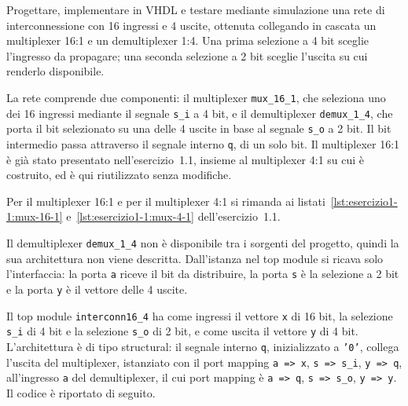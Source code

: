 \label{sec:esercizio1-2}

\begin{traccia}
Progettare, implementare in VHDL e testare mediante simulazione una rete di interconnessione con 16 ingressi e 4 uscite, ottenuta collegando in cascata un multiplexer 16:1 e un demultiplexer 1:4. Una prima selezione a 4 bit sceglie l'ingresso da propagare; una seconda selezione a 2 bit sceglie l'uscita su cui renderlo disponibile.
\end{traccia}

\progetto

La rete comprende due componenti: il multiplexer \texttt{mux\_16\_1}, che seleziona uno dei 16 ingressi mediante il segnale \texttt{s\_i} a 4 bit, e il demultiplexer \texttt{demux\_1\_4}, che porta il bit selezionato su una delle 4 uscite in base al segnale \texttt{s\_o} a 2 bit. Il bit intermedio passa attraverso il segnale interno \texttt{q}, di un solo bit. Il multiplexer 16:1 è già stato presentato nell'esercizio~1.1, insieme al multiplexer 4:1 su cui è costruito, ed è qui riutilizzato senza modifiche.


\implementazione

Per il multiplexer 16:1 e per il multiplexer 4:1 si rimanda ai listati~\ref{lst:esercizio1-1:mux-16-1} e~\ref{lst:esercizio1-1:mux-4-1} dell'esercizio~1.1.

Il demultiplexer \texttt{demux\_1\_4} non è disponibile tra i sorgenti del progetto, quindi la sua architettura non viene descritta. Dall'istanza nel top module si ricava solo l'interfaccia: la porta \texttt{a} riceve il bit da distribuire, la porta \texttt{s} è la selezione a 2 bit e la porta \texttt{y} è il vettore delle 4 uscite.


Il top module \texttt{interconn16\_4} ha come ingressi il vettore \texttt{x} di 16 bit, la selezione \texttt{s\_i} di 4 bit e la selezione \texttt{s\_o} di 2 bit, e come uscita il vettore \texttt{y} di 4 bit. L'architettura è di tipo structural: il segnale interno \texttt{q}, inizializzato a \texttt{'0'}, collega l'uscita del multiplexer, istanziato con il port mapping \texttt{a => x}, \texttt{s => s\_i}, \texttt{y => q}, all'ingresso \texttt{a} del demultiplexer, il cui port mapping è \texttt{a => q}, \texttt{s => s\_o}, \texttt{y => y}. Il codice è riportato di seguito.

